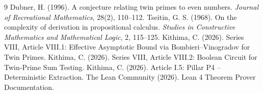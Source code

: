 \documentclass[11pt,a4paper]{article}
\begin{document}

\begin{thebibliography}{9}
  Dubner, H. (1996). A conjecture relating twin primes to even numbers. \emph{Journal of Recreational Mathematics}, 28(2), 110–112.
  Tseitin, G. S. (1968). On the complexity of derivation in propositional calculus. \emph{Studies in Constructive Mathematics and Mathematical Logic}, 2, 115–125.
  Kithima, C. (2026). Series VIII, Article VIII.1: Effective Asymptotic Bound via Bombieri–Vinogradov for Twin Primes.
  Kithima, C. (2026). Series VIII, Article VIII.2: Boolean Circuit for Twin‑Prime Sum Testing.
  Kithima, C. (2026). Article I.5: Pillar P4 – Deterministic Extraction.
  The Lean Community (2026). Lean 4 Theorem Prover Documentation.
\end{thebibliography}
\end{document}
